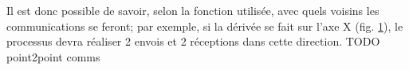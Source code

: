 Il est donc possible de savoir, selon la fonction utilisée, avec quels voisins les communications se feront; par exemple, si la dérivée se fait sur l'axe X (fig. \ref{fig:comm_dim1}), le processus devra réaliser 2 envois et 2 réceptions dans cette direction.  TODO point2point comms

\begin{figure}[h!]
  \centering
  \begin{subfigure}[b]{0.5\textwidth}
    \centering
  \caption{\label{fig:comm_dim1}}
  \end{subfigure}%
  ~
  \begin{subfigure}[b]{0.5\textwidth}
    \centering

\end{subfigure}
\end{figure}
